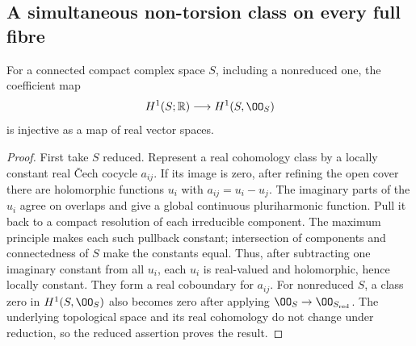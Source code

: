 \subsection{A simultaneous non-torsion class on every full fibre}

\begin{lemma}[D.1.7; Proved]\label{st:D.1.7}
For a connected compact complex space $S$, including a nonreduced
one, the coefficient map
\[
H^1(S;\mathbb R)\longrightarrow H^1(S,\OO_S)
\]
is injective as a map of real vector spaces.
\end{lemma}
\begin{proof}
First take $S$ reduced. Represent a real cohomology class by a
locally constant real \v Cech cocycle $a_{ij}$. If its image is zero,
after refining the open cover there are holomorphic functions $u_i$
with $a_{ij}=u_i-u_j$. The imaginary parts of the $u_i$ agree on
overlaps and give a global continuous pluriharmonic function.
Pull it back to a compact resolution of each irreducible component.
The maximum principle makes each such pullback constant; intersection
of components and connectedness of $S$ make the constants equal.
Thus, after subtracting one imaginary constant from all $u_i$,
each $u_i$ is real-valued and holomorphic, hence locally constant.
They form a real coboundary for $a_{ij}$. For nonreduced $S$, a
class zero in $H^1(S,\OO_S)$ also becomes zero after applying
$\OO_S\to\OO_{S_{\rm red}}$. The underlying topological space
and its real cohomology do not change under reduction, so the
reduced assertion proves the result.
\end{proof}

